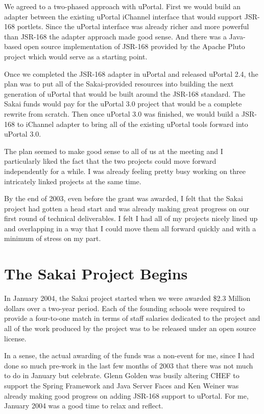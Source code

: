 \documentclass[12pt]{book}
\begin{document}
We agreed to a two-phased approach with uPortal.  First we would build an adapter
between the existing uPortal iChannel interface that would support
JSR-168 portlets.  Since the uPortal interface was already richer and more powerful
than JSR-168 the adapter approach made good sense.  And there was a Java-based
open source implementation of JSR-168 provided by the Apache Pluto project which
would serve as a starting point.

Once we completed the JSR-168 adapter in uPortal and released uPortal 2.4, the
plan was to put all of the Sakai-provided resources into building the next generation
of uPortal that would be built around the JSR-168 standard.
The Sakai funds would pay for the uPortal 3.0 project that would be a complete
rewrite from scratch.   Then once uPortal 3.0 was finished, we would build a
JSR-168 to iChannel adapter to bring all of the existing uPortal tools forward
into uPortal 3.0.

The plan seemed to make good sense to all of us at the meeting and I particularly
liked the fact that the two projects could move forward independently for a while.
I was already feeling pretty busy working on three intricately linked
projects at the same time.

By the end of 2003, even before the grant was awarded, I felt that the Sakai project
had gotten a head start and was already making great progress on our first round of
technical deliverables.  I felt I had all of my projects nicely lined up and overlapping
in a way that I could move them all forward quickly and with a minimum of stress
on my part.

\chapter{The Sakai Project Begins}

In January 2004, the Sakai project started when we were awarded \$2.3 Million dollars
over a two-year period.   Each of the founding schools were required to provide a
four-to-one match in terms of staff salaries dedicated to the project and all of the work
produced by the project was to be released under an open source license.

In a sense, the actual awarding of the funds was a non-event for me,
since I had done so much pre-work in the last
few months of 2003 that there was not much to do in January but celebrate.
Glenn Golden was busily altering CHEF to support the Spring Framework and Java Server
Faces and Ken Weiner was already making good progress on adding JSR-168 support
to uPortal.  For me, January 2004 was a good time to relax and reflect.
\end{document}
